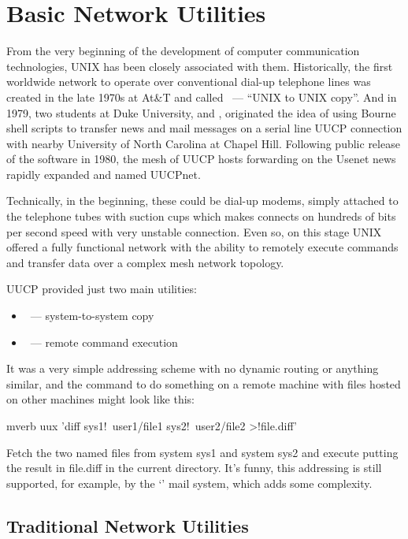 \section*{Basic Network Utilities} %

From the very beginning of the development of computer communication
technologies, UNIX has been closely associated with them. Historically,
the first worldwide network to operate over conventional dial-up telephone
lines was created in the late 1970s at At\&T and called ~---
``UNIX to UNIX copy''. And in 1979, two students at Duke University,
 and , originated the idea of
using Bourne shell scripts to transfer news and mail messages on a serial line
UUCP connection with nearby University of North Carolina at Chapel Hill.
Following public release of the software in 1980, the mesh of UUCP hosts
forwarding on the Usenet news rapidly expanded and named UUCPnet.

Technically, in the beginning, these could be dial-up modems, simply attached
to the telephone tubes with suction cups which makes connects on hundreds of
bits per second speed with very unstable connection. Even so, on this stage
UNIX offered a fully functional network with the ability to remotely execute
commands and transfer data over a complex mesh network topology.

UUCP provided just two main utilities:
\begin{itemize}
\item {}~--- system-to-system copy
\item {}~--- remote command execution
\end{itemize}

It was a very simple addressing scheme with no dynamic routing or anything
similar, and the command to do something on a remote machine with files hosted
on other machines might look like this:
\begin{code}{mverb}
uux 'diff sys1!~user1/file1 sys2!~user2/file2 >!file.diff'
\end{code}
Fetch the two named files from system sys1 and system sys2 and execute
 putting the result in file.diff in the current directory.
It's funny, this addressing is still supported, for example,
by the `' mail system, which adds some complexity.

\subsection*{Traditional Network Utilities} %

